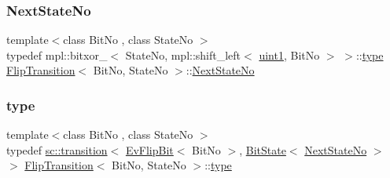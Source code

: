 \subsubsection{\texorpdfstring{Next\+State\+No}{NextStateNo}\hspace{0.1cm}{\footnotesize\ttfamily [2/2]}}
{\footnotesize\ttfamily template$<$class Bit\+No , class State\+No $>$ \\
typedef mpl\+::bitxor\+\_\+$<$ State\+No, mpl\+::shift\+\_\+left$<$ \mbox{\hyperlink{_performance_8cpp_afada4030cdd8c9628ca412e4409d07d1}{uint1}}, Bit\+No $>$ $>$\+::\mbox{\hyperlink{struct_flip_transition_acb1fc32084f19c5bd106af2da39df89e}{type}} \mbox{\hyperlink{struct_flip_transition}{Flip\+Transition}}$<$ Bit\+No, State\+No $>$\+::\mbox{\hyperlink{struct_flip_transition_a16b33cbdacbffc0e20e2ae9c76e8f645}{Next\+State\+No}}\hspace{0.3cm}{\ttfamily [private]}}

\mbox{\label{struct_flip_transition_acb1fc32084f19c5bd106af2da39df89e}} 
\subsubsection{\texorpdfstring{type}{type}\hspace{0.1cm}{\footnotesize\ttfamily [1/2]}}
{\footnotesize\ttfamily template$<$class Bit\+No , class State\+No $>$ \\
typedef \mbox{\hyperlink{classboost_1_1statechart_1_1transition}{sc\+::transition}}$<$ \mbox{\hyperlink{struct_ev_flip_bit}{Ev\+Flip\+Bit}}$<$ Bit\+No $>$, \mbox{\hyperlink{struct_bit_state}{Bit\+State}}$<$ \mbox{\hyperlink{struct_flip_transition_a16b33cbdacbffc0e20e2ae9c76e8f645}{Next\+State\+No}} $>$ $>$ \mbox{\hyperlink{struct_flip_transition}{Flip\+Transition}}$<$ Bit\+No, State\+No $>$\+::\mbox{\hyperlink{struct_flip_transition_acb1fc32084f19c5bd106af2da39df89e}{type}}}

\mbox{\label{struct_flip_transition_a6cf04e1d55488950cbaeeae1f16f8f21}} 
